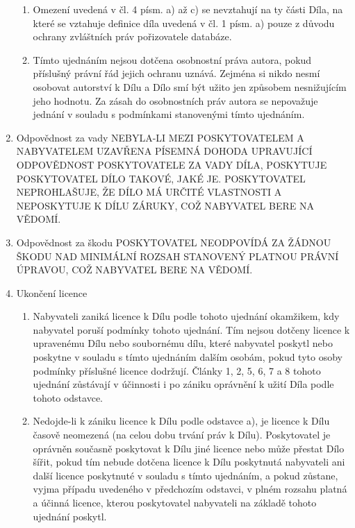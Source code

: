 \begin{enumerate}
\begin{enumerate}
      \item Omezení uvedená v čl. 4 písm. a) až c) se nevztahují na ty části Díla, na které se vztahuje definice díla uvedená v čl. 1 písm. a) pouze z důvodu ochrany zvláštních práv pořizovatele databáze.
      \item Tímto ujednáním nejsou dotčena osobnostní práva autora, pokud příslušný právní řád jejich ochranu uznává. Zejména si nikdo nesmí osobovat autorství k Dílu a Dílo smí být užito jen způsobem nesnižujícím jeho hodnotu. Za zásah do osobnostních práv autora se nepovažuje jednání v souladu s podmínkami stanovenými tímto ujednáním.
    \end{enumerate}

  \item Odpovědnost za vady
NEBYLA-LI MEZI POSKYTOVATELEM A NABYVATELEM UZAVŘENA PÍSEMNÁ DOHODA UPRAVUJÍCÍ ODPOVĚDNOST POSKYTOVATELE ZA VADY DÍLA, POSKYTUJE POSKYTOVATEL DÍLO TAKOVÉ, JAKÉ JE. POSKYTOVATEL NEPROHLAŠUJE, ŽE DÍLO MÁ URČITÉ VLASTNOSTI A NEPOSKYTUJE K DÍLU ZÁRUKY, COŽ NABYVATEL BERE NA VĚDOMÍ.

  \item Odpovědnost za škodu
POSKYTOVATEL NEODPOVÍDÁ ZA ŽÁDNOU ŠKODU NAD MINIMÁLNÍ ROZSAH STANOVENÝ PLATNOU PRÁVNÍ ÚPRAVOU, COŽ NABYVATEL BERE NA VĚDOMÍ.

  \item Ukončení licence
    \begin{enumerate}
      \item Nabyvateli zaniká licence k Dílu podle tohoto ujednání okamžikem, kdy nabyvatel poruší podmínky tohoto ujednání. Tím nejsou dotčeny licence k upravenému Dílu nebo soubornému dílu, které nabyvatel poskytl nebo poskytne v souladu s tímto ujednáním dalším osobám, pokud tyto osoby podmínky příslušné licence dodržují. Články 1, 2, 5, 6, 7 a 8 tohoto ujednání zůstávají v účinnosti i po zániku oprávnění k užití Díla podle tohoto odstavce.
      \item Nedojde-li k zániku licence k Dílu podle odstavce a), je licence k Dílu časově neomezená (na celou dobu trvání práv k Dílu). Poskytovatel je oprávněn současně poskytovat k Dílu jiné licence nebo může přestat Dílo šířit, pokud tím nebude dotčena licence k Dílu poskytnutá nabyvateli ani další licence poskytnuté v souladu s tímto ujednáním, a pokud zůstane, vyjma případu uvedeného v předchozím odstavci, v plném rozsahu platná a účinná licence, kterou poskytovatel nabyvateli na základě tohoto ujednání poskytl.
    \end{enumerate}


\end{enumerate}
